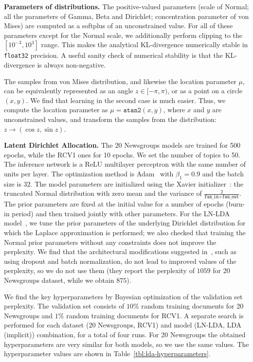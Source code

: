 \documentclass{article}
\begin{document}
\begin{refsection}
\textbf{Parameters of distributions.}
The positive-valued parameters (scale of Normal; all the parameters of Gamma, Beta and Dirichlet; concentration parameter of von Mises) are computed as a softplus of an unconstrained value.
For all of these parameters except for the Normal scale, we additionally perform clipping to the $[10^{-3}, 10^{3}]$ range.
This makes the analytical KL-divergence numerically stable in \texttt{float32} precision.
A useful sanity check of numerical stability is that the KL-divergence is always non-negative.

The samples from von Mises distribution, and likewise the location parameter $\mu$, can be equivalently represented as an angle $z \in [-\pi, \pi)$, or as a point on a circle $(x, y)$.
We find that learning in the second case is much easier.
Thus, we compute the location parameter as $\mu = \texttt{atan2}(x, y)$, where $x$ and $y$ are unconstrained values, and transform the samples from the distribution: $z \to (\cos z, \sin z)$.

\textbf{Latent Dirichlet Allocation.}
The 20 Newsgroups models are trained for 500 epochs, while the RCV1 ones for 10 epochs.
We set the number of topics to 50.
The inference network is a ReLU multilayer perceptron with the same number of units per layer.
The optimization method is Adam~\cite{kingma2015adam} with $\beta_1 = 0.9$ and the batch size is $32$.
The model parameters are initialized using the Xavier initializer~\cite{glorot2010understanding}: the truncated Normal distribution with zero mean and the variance of $\frac{2}{\texttt{fan\_in} + \texttt{fan\_out}}$.
The prior parameters are fixed at the initial value for a number of epochs (burn-in period) and then trained jointly with other parameters.
For the LN-LDA model~\cite{srivastava2017autoencoding}, we tune the prior parameters of the underlying Dirichlet distribution for which the Laplace approximation is performed; we also checked that training the Normal prior parameters without any constraints does not improve the perplexity.
We find that the architectural modifications suggested in~\cite{srivastava2017autoencoding}, such as using dropout and batch normalization, do not lead to improved values of the perplexity, so we do not use them (they report the perplexity of $1059$ for 20 Newsgroups dataset, while we obtain $875$).

We find the key hyperparameters by Bayesian optimization of the validation set perplexity.
The validation set consists of $10\%$ random training documents for 20 Newsgroups and $1\%$ random training documents for RCV1.
A separate search is performed for each dataset (20 Newsgroups, RCV1) and model (LN-LDA, LDA (implicit)) combination, for a total of four runs.
For 20 Newsgroups the obtained hyperparameters are very similar for both models, so we use the same values.
The hyperparameter values are shown in Table~\ref{tbl:lda-hyperparameters}.


\end{refsection}
\end{document}
